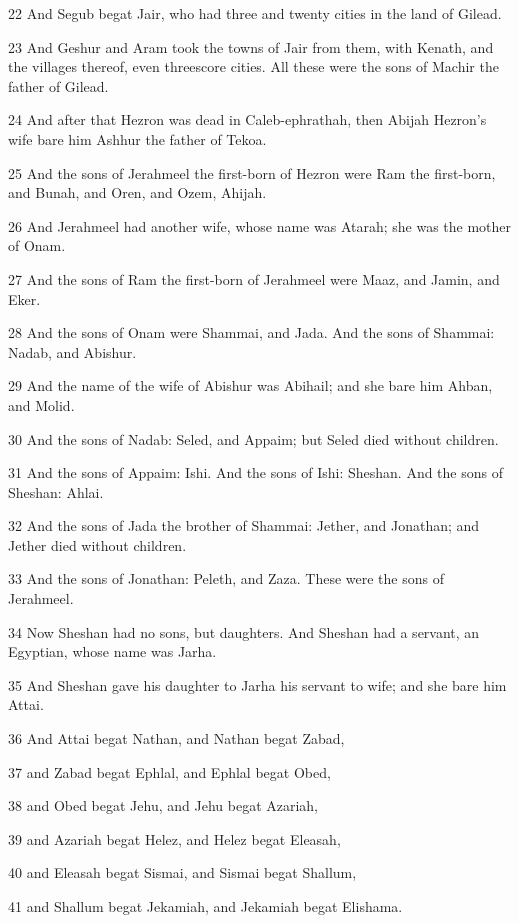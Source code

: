 \par 22 And Segub begat Jair, who had three and twenty cities in the land of Gilead.
\par 23 And Geshur and Aram took the towns of Jair from them, with Kenath, and the villages thereof, even threescore cities. All these were the sons of Machir the father of Gilead.
\par 24 And after that Hezron was dead in Caleb-ephrathah, then Abijah Hezron's wife bare him Ashhur the father of Tekoa.
\par 25 And the sons of Jerahmeel the first-born of Hezron were Ram the first-born, and Bunah, and Oren, and Ozem, Ahijah.
\par 26 And Jerahmeel had another wife, whose name was Atarah; she was the mother of Onam.
\par 27 And the sons of Ram the first-born of Jerahmeel were Maaz, and Jamin, and Eker.
\par 28 And the sons of Onam were Shammai, and Jada. And the sons of Shammai: Nadab, and Abishur.
\par 29 And the name of the wife of Abishur was Abihail; and she bare him Ahban, and Molid.
\par 30 And the sons of Nadab: Seled, and Appaim; but Seled died without children.
\par 31 And the sons of Appaim: Ishi. And the sons of Ishi: Sheshan. And the sons of Sheshan: Ahlai.
\par 32 And the sons of Jada the brother of Shammai: Jether, and Jonathan; and Jether died without children.
\par 33 And the sons of Jonathan: Peleth, and Zaza. These were the sons of Jerahmeel.
\par 34 Now Sheshan had no sons, but daughters. And Sheshan had a servant, an Egyptian, whose name was Jarha.
\par 35 And Sheshan gave his daughter to Jarha his servant to wife; and she bare him Attai.
\par 36 And Attai begat Nathan, and Nathan begat Zabad,
\par 37 and Zabad begat Ephlal, and Ephlal begat Obed,
\par 38 and Obed begat Jehu, and Jehu begat Azariah,
\par 39 and Azariah begat Helez, and Helez begat Eleasah,
\par 40 and Eleasah begat Sismai, and Sismai begat Shallum,
\par 41 and Shallum begat Jekamiah, and Jekamiah begat Elishama.
